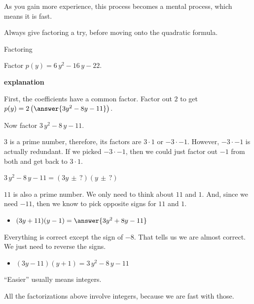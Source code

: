 \documentclass{ximera}
\begin{document}
As you gain more experience, this process becomes a mental process, which means it is fast. 


Always give factoring a try, before moving onto the quadratic formula. 






\begin{example} Factoring

Factor $p(y) = 6 \, y^2 - 16 \, y - 22$.


\textbf{\textcolor{red!75!green}{explanation}} 


First, the coefficients have a common factor.  Factor out $2$ to get $p(y) = 2 \left( \answer{3 y^2 - 8 y - 11} \right)$.


Now factor $3 \, y^2 - 8 \, y - 11$.



$3$ is a prime number, therefore, its factors are $3 \cdot 1$ or $-3 \cdot -1$. However, $-3 \cdot -1$ is actually redundant.  If we picked $-3 \cdot -1$, then we could just factor out $-1$ from both and get back to $3 \cdot 1$.


$3 \, y^2 - 8 \, y - 11 = (3y \, \pm \, ?) (y \, \pm \, ?) $


$11$ is also a prime number. We only need to think about $11$ and $1$. And, since we need $-11$, then we know to pick opposite signs for $11$ and $1$.



\begin{itemize}
\item $(3y + 11) (y - 1) = \answer{3 y^2 + 8 y - 11}$
\end{itemize}

Everything is correct except the sign of $-8$. That tells us we are almost correct. We just need to reverse the signs.


\begin{itemize}
\item $(3y - 11) (y + 1) = 3 \, y^2 - 8 \, y - 11$
\end{itemize}





\end{example}


``Easier'' usually means integers.  

All the factorizations above involve integers, because we are fast with those. 
\end{document}
